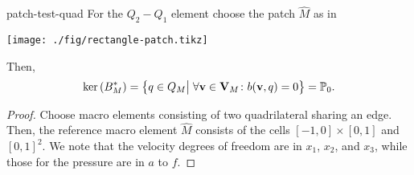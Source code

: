 \begin{Lemma}{patch-test-quad}
  For the $Q_2-Q_1$ element choose the patch $\widehat M$ as in
  \begin{center}
    \texttt{[image: ./fig/rectangle-patch.tikz]}
  \end{center}
  Then,
  \begin{gather}
    \operatorname{ker}\left(B_M^*\right) = \bigl\{ q\in Q_M \big\vert
    \;\forall \mathbf v\in \mathbf V_M\colon b(\mathbf v,q) = 0 \bigr\}
    = \mathbb P_0.
  \end{gather}
\end{Lemma}

\begin{proof}
  Choose macro elements consisting of two quadrilateral sharing an
  edge. Then, the reference macro element $\widehat M$ consists of the
  cells $[-1,0]\times [0,1]$ and $[0,1]^2$. We note that the velocity
  degrees of freedom are in $x_1$, $x_2$, and $x_3$, while those for
  the pressure are in $a$ to $f$.


\end{proof}

